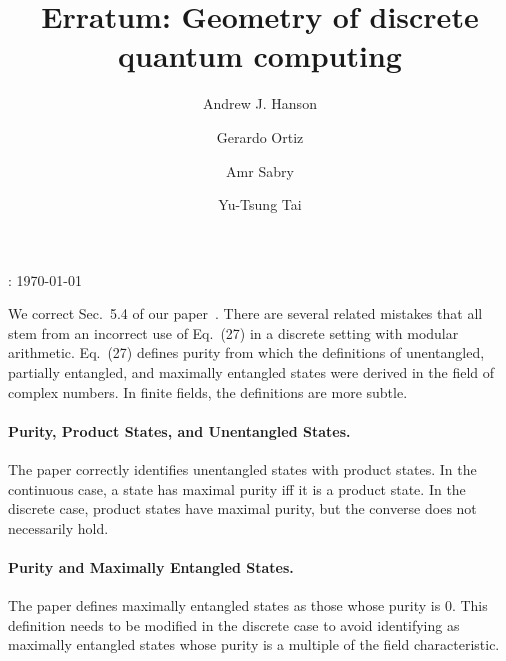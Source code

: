 \documentclass{iopart}
\begin{document}
\title{Erratum: Geometry of discrete quantum computing}


\author{Andrew J. Hanson}


\address{School of Informatics and Computing, Indiana University, Bloomington,
IN 47405, U.S.A}


\author{Gerardo Ortiz}


\address{Department of Physics, Indiana University, Bloomington, IN 47405,
U.S.A}


\author{Amr Sabry}


\address{School of Informatics and Computing, Indiana University, Bloomington,
IN 47405, U.S.A}


\author{Yu-Tsung Tai}


\address{Department of Mathematics, Indiana University, Bloomington, IN 47405,
U.S.A}


\address{School of Informatics and Computing, Indiana University, Bloomington,
IN 47405, U.S.A}


: {\today}

\maketitle

\noindent We correct Sec.~5.4 of our paper~\cite{geometry}. There are several related mistakes that all stem from an incorrect use of Eq.~(27) in a discrete setting with modular arithmetic. Eq.~(27) defines purity from which the definitions of unentangled, partially entangled, and maximally entangled states were derived in the field of complex numbers. In finite fields, the definitions are more subtle.
\paragraph*{Purity, Product States, and Unentangled States.} The paper correctly identifies unentangled states with product states. In the continuous case, a state has maximal purity iff it is a product state. In the discrete case, product states have maximal purity, but the converse does not necessarily hold. 
\paragraph*{Purity and Maximally Entangled States.} The paper defines maximally entangled states as those whose purity is 0. This definition needs to be modified in the discrete case to avoid identifying as maximally entangled states whose purity is a multiple of the field characteristic.
\end{document}
